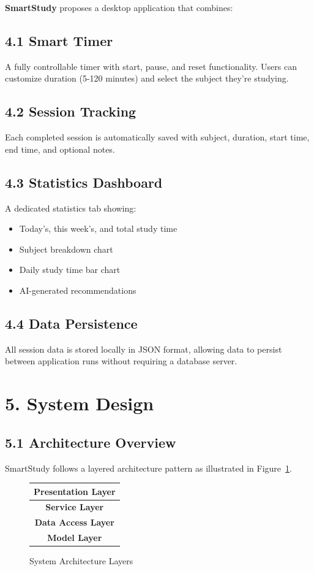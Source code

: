 \documentclass[12pt,a4paper]{article}
\begin{document}
\textbf{SmartStudy} proposes a desktop application that combines:

\subsection{4.1 Smart Timer}
A fully controllable timer with start, pause, and reset functionality. Users can customize duration (5-120 minutes) and select the subject they're studying.

\subsection{4.2 Session Tracking}
Each completed session is automatically saved with subject, duration, start time, end time, and optional notes.

\subsection{4.3 Statistics Dashboard}
A dedicated statistics tab showing:
\begin{itemize}
    \item Today's, this week's, and total study time
    \item Subject breakdown chart
    \item Daily study time bar chart
    \item AI-generated recommendations
\end{itemize}

\subsection{4.4 Data Persistence}
All session data is stored locally in JSON format, allowing data to persist between application runs without requiring a database server.

\section{5. System Design}

\subsection{5.1 Architecture Overview}

SmartStudy follows a layered architecture pattern as illustrated in Figure~\ref{fig:architecture}.

\begin{figure}[htbp]
    \centering
    \begin{tabular}{|c|}
        \hline
        \textbf{Presentation Layer} \\
        \hline
        \textbf{Service Layer} \\
        \hline
        \textbf{Data Access Layer} \\
        \hline
        \textbf{Model Layer} \\
        \hline
    \end{tabular}
    \caption{System Architecture Layers}
    \label{fig:architecture}
\end{figure}
\end{document}
